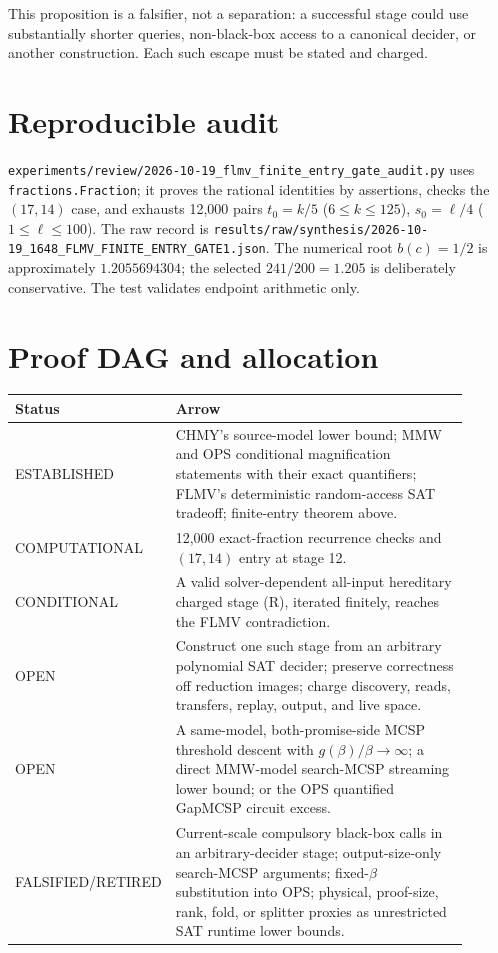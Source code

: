 \documentclass[11pt]{article}
\begin{document}
This proposition is a falsifier, not a separation: a successful stage could
use substantially shorter queries, non-black-box access to a canonical
decider, or another construction.  Each such escape must be stated and charged.

\section{Reproducible audit}

\texttt{experiments/review/2026-10-19\_flmv\_finite\_entry\_gate\_audit.py}
uses \texttt{fractions.Fraction}; it proves the rational identities by
assertions, checks the $(17,14)$ case, and exhausts 12,000 pairs
$t_0=k/5$ ($6\le k\le125$), $s_0=\ell/4$ ($1\le\ell\le100$).  The raw record is
\texttt{results/raw/synthesis/2026-10-19\_1648\_FLMV\_FINITE\_ENTRY\_GATE1.json}.
The numerical root $b(c)=1/2$ is approximately $1.2055694304$; the selected
$241/200=1.205$ is deliberately conservative.  The test validates endpoint
arithmetic only.

\section{Proof DAG and allocation}

\begin{center}
\begin{tabular}{p{0.20\linewidth}p{0.70\linewidth}}
\toprule
Status & Arrow \\
\midrule
ESTABLISHED & CHMY's source-model lower bound; MMW and OPS conditional
magnification statements with their exact quantifiers; FLMV's deterministic
random-access SAT tradeoff; finite-entry theorem above. \\
COMPUTATIONAL & 12,000 exact-fraction recurrence checks and $(17,14)$ entry at
stage 12. \\
CONDITIONAL & A valid solver-dependent all-input hereditary charged stage (R),
iterated finitely, reaches the FLMV contradiction. \\
OPEN & Construct one such stage from an arbitrary polynomial SAT decider;
preserve correctness off reduction images; charge discovery, reads, transfers,
replay, output, and live space. \\
OPEN & A same-model, both-promise-side MCSP threshold descent with
$g(\beta)/\beta\to\infty$; a direct MMW-model search-MCSP streaming lower bound;
or the OPS quantified GapMCSP circuit excess. \\
FALSIFIED/RETIRED & Current-scale compulsory black-box calls in an
arbitrary-decider stage; output-size-only search-MCSP arguments; fixed-$\beta$
substitution into OPS; physical, proof-size, rank, fold, or splitter proxies as
unrestricted SAT runtime lower bounds. \\
\bottomrule
\end{tabular}
\end{center}
\end{document}
